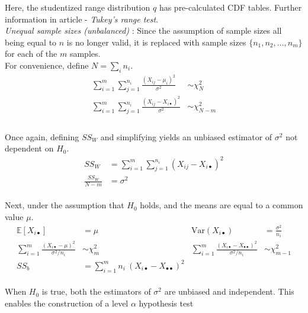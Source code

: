 Here, the studentized range distribution $ q $ has pre-calculated CDF tables. Further information in article - \textit{Tukey's range test}.\\

\textit{Unequal sample sizes (unbalanced)} : Since the assumption of sample sizes all being equal to $ n $ is no longer valid, it is replaced with sample sizes $ \{n_1, n_2, \dots, n_m\} $ for each of the $ m $ samples.\\

For convenience, define $ N = \sum_i n_i $.\\

\begin{align}
	\sum\limits_{i = 1}^{m} \sum\limits_{j = 1}^{n_i} \frac{(X_{ij} - \mu_i)^2}{\sigma^2} &\sim \chi^2_{N} \\
	\sum\limits_{i = 1}^{m} \sum\limits_{j = 1}^{n_i} \frac{(X_{ij} - X_{i\bullet})^2}{\sigma^2} &\sim \chi^2_{N - m} \\
\end{align}\\

Once again, defining $ SS_W $ and simplifying yields an unbiased estimator of $ \sigma^2 $ not dependent on $ H_0 $.\\

\begin{align}
	SS_W &= \sum\limits_{i = 1}^{m} \sum\limits_{j = 1}^{n_i} (X_{ij} - X_{i\bullet})^2 \\
	\frac{SS_W}{N-m} &= \sigma^2
\end{align}\\

Next, under the assumption that $ H_0 $ holds, and the means are equal to a common value $ \mu $.\\

\begin{align}
	\mathbb{E}[X_{i\bullet}] &= \mu & \mathrm{Var}(X_{i\bullet}) &= \frac{\sigma^2}{n_i} \nonumber \\
	\sum\limits_{i = 1}^{m} \frac{(X_{i\bullet} - \mu)^2}{\sigma^2 / n_i} &\sim \chi^2_{m} & \sum\limits_{i = 1}^{m} \frac{(X_{i\bullet} - X_{\bullet\bullet})^2}{\sigma^2 / n_i} &\sim \chi^2_{m-1} \\
	SS_b &= \sum\limits_{i = 1}^{m} n_i\ (X_{i\bullet} - X_{\bullet\bullet})^2
\end{align}\\

When $ H_0 $ is true, both the estimators of $ \sigma^2 $ are unbiased and independent. This enables the construction of a level $ \alpha $ hypothesis test\\

